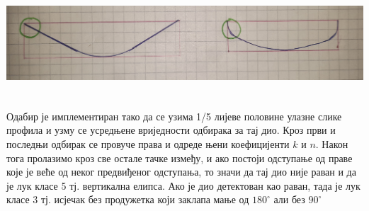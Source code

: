 \documentclass[12pt]{article}
\begin{document}
\vspace{0.5cm}
\begin{center}
    \centering 
    \includegraphics[height=4cm, width=15cm]{images/detect5.jpg}
\end{center}
\vspace{0.5cm}
Одабир је имплементиран тако да се узима 1/5 лијеве половине улазне слике профила и узму се усредњене вриједности одбирака за тај дио. Кроз први и последњи одбирак се провуче права и одреде њени коефицијенти $k$ и $n$. Након тога пролазимо кроз све остале тачке између, и ако постоји одступање од праве које је веће од неког предвиђеног одступања, то значи да тај дио није раван и да је лук класе 5 тј. вертикална елипса. Ако је дио детектован као раван, тада је лук класе 3 тј. исјечак без продужетка који заклапа мање од $180^\circ$ али без $90^\circ$



\newpage
\end{document}
